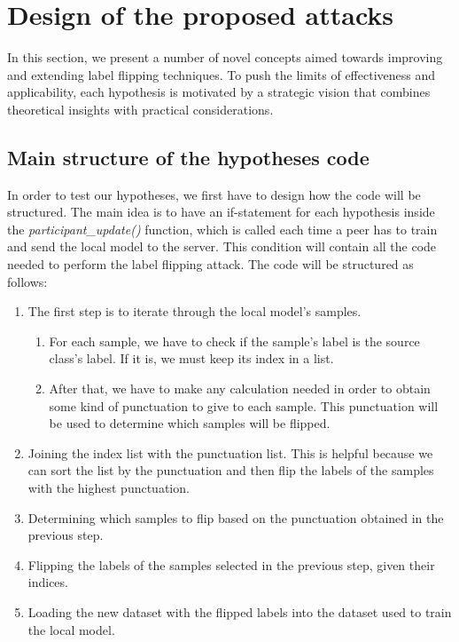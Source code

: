 \section{Design of the proposed attacks} \label{sec:design_attacks}
In this section, we present a number of novel concepts aimed towards improving and extending label flipping techniques. To push the limits of effectiveness and applicability, each hypothesis is motivated by a strategic vision that combines theoretical insights with practical considerations.

\subsection{Main structure of the hypotheses code}
In order to test our hypotheses, we first have to design how the code will be structured. The main idea is to have an if-statement for each hypothesis inside the \textit{participant\_update()} function, which is called each time a peer has to train and send the local model to the server. This condition will contain all the code needed to perform the label flipping attack. The code will be structured as follows:
\begin{enumerate}
        \item The first step is to iterate through the local model's samples.
                \begin{enumerate}
                        \item For each sample, we have to check if the sample's label is the source class's label. If it is, we must keep its index in a list.
                        \item After that, we have to make any calculation needed in order to obtain some kind of punctuation to give to each sample. This punctuation will be used to determine which samples will be flipped.
                \end{enumerate}
        \item Joining the index list with the punctuation list. This is helpful because we can sort the list by the punctuation and then flip the labels of the samples with the highest punctuation.
        \item Determining which samples to flip based on the punctuation obtained in the previous step.
        \item Flipping the labels of the samples selected in the previous step, given their indices.
        \item Loading the new dataset with the flipped labels into the dataset used to train the local model.
\end{enumerate}

